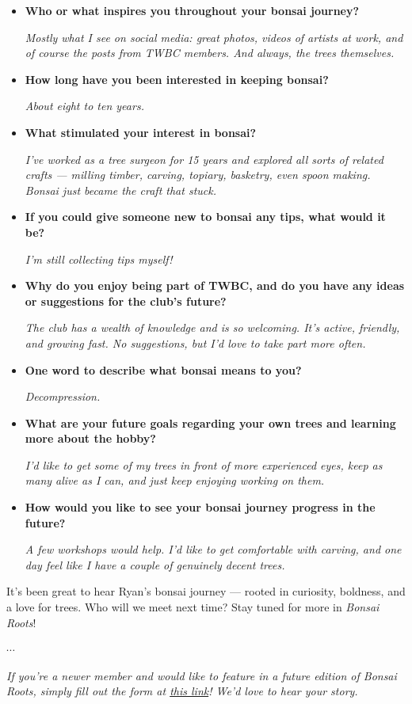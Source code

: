 \begin{itemize}
    \item \textbf{Who or what inspires you throughout your bonsai journey?}

    \emph{Mostly what I see on social media: great photos, videos of artists at work, and of course the posts from TWBC members. And always, the trees themselves.}
    
    \item \textbf{How long have you been interested in keeping bonsai?}

    \emph{About eight to ten years.}

    \item \textbf{What stimulated your interest in bonsai?}

    \emph{I've worked as a tree surgeon for 15 years and explored all sorts of related crafts — milling timber, carving, topiary, basketry, even spoon making. Bonsai just became the craft that stuck.}

    \item \textbf{If you could give someone new to bonsai any tips, what would it be?}

    \emph{I'm still collecting tips myself!}

    \item \textbf{Why do you enjoy being part of TWBC, and do you have any ideas or suggestions for the club's future?}

    \emph{The club has a wealth of knowledge and is so welcoming. It's active, friendly, and growing fast. No suggestions, but I'd love to take part more often.}

    \item \textbf{One word to describe what bonsai means to you?}

    \emph{Decompression.}

    \item \textbf{What are your future goals regarding your own trees and learning more about the hobby?}

    \emph{I'd like to get some of my trees in front of more experienced eyes, keep as many alive as I can, and just keep enjoying working on them.}

    \item \textbf{How would you like to see your bonsai journey progress in the future?}

    \emph{A few workshops would help. I'd like to get comfortable with carving, and one day feel like I have a couple of genuinely decent trees.}
\end{itemize}

It's been great to hear Ryan's bonsai journey — rooted in curiosity, boldness, and a love for trees.
Who will we meet next time?
Stay tuned for more in \emph{Bonsai Roots}!

\begin{center}
    $\cdots$
\end{center}

\noindent
\emph{If you're a newer member and would like to feature in a future edition of Bonsai Roots, simply fill out the form at \href{https://forms.gle/quVXa4L8rhpnT5kr6}{this link}! We'd love to hear your story.}
\closearticle 
\clearpage
